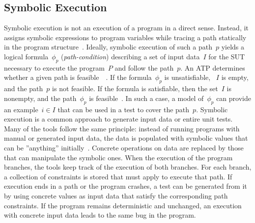 \documentclass{article}
\begin{document}
\subsection{Symbolic Execution}
Symbolic execution is not an execution of a program in a direct sense. Instead, it assigns symbolic expressions to program variables while tracing a path statically in the program structure~\cite{McMinn_2004}. Ideally, symbolic execution of such a path~$p$ yields a logical formula~$\phi_{p}$ (\textit{path-condition}) describing a set of input data~$I$ for the \ac{SUT} necessary to execute the program~$P$ and follow the path~$p$. An \ac{ATP} determines whether a given path is feasible~~\cite{Clarke1976,King1976}. If the formula~$\phi_{p}$ is unsatisfiable, ~$I$ is empty, and the path~$p$ is not feasible. If the formula is satisfiable, then the set~$I$ is nonempty, and the path~$\phi_{p}$ is feasible~\cite{Ball2015}. In such a case, a model of~$\phi_{p}$ can provide an example~$i \in I$ that can be used in a test to cover the path~$p$. Symbolic execution is a common approach to generate input data or entire unit tests. Many of the tools follow the same principle: instead of running programs with manual or generated input data, the data is populated with symbolic values that can be ''anything'' initially~\cite{cadar2008klee}. Concrete operations on data are replaced by those that can manipulate the symbolic ones. When the execution of the program branches, the tools keep track of the execution of both branches. For each branch, a collection of constraints is stored that must apply to execute that path. If execution ends in a path or the program crashes, a test can be generated from it by using concrete values as input data that satisfy the corresponding path constraints. If the program remains deterministic and unchanged, an execution with concrete input data leads to the same bug in the program.
\end{document}
